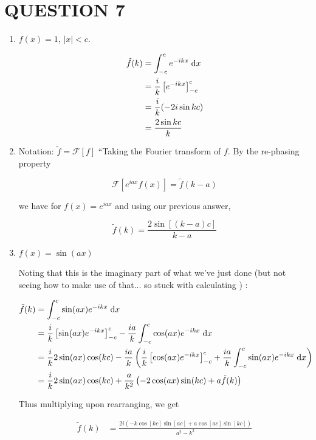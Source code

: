 \documentclass[a4paper]{article}
\begin{document}
\section{QUESTION 7}

\begin{enumerate}
	\item $ f(x) = 1 $, $ | x | < c $.
	
	\begin{align*}
	\tilde{f}(k)  & = \int_{-c}^{c} e^{-ikx} \; \mathrm{d} x   \\
	& = \frac{i}{k} \left[    e^{-ikx}  \right]_{-c}^{c} \\
	& =  \frac{i}{k}(- 2 i \sin k c) \\
	& = \frac{2 \sin kc}{k}
	\end{align*}
	
	\item
	
	Notation: $ \tilde{f} = \mathcal{F}[f] $ ``Taking the Fourier transform of $ f $. By the re-phasing property
	
	\[ \mathcal{F}[ e^{iax}f(x) ] = \tilde{f}(k-a) \]
	
	we have for $ f(x) = e^{iax} $ and using our previous answer,
	
	\[ \tilde{f}(k) = \frac{2\sin[(k-a)c]}{k-a} \]
	
	\item $ f(x) = \sin (ax) $
	
	Noting that this is the imaginary part of what we've just done (but not seeing how to make use of that... so stuck with calculating ) :
	
	\begin{align*}
	\tilde{f}(k)  & = \int_{-c}^{c} \sin(ax) e^{-ikx} \; \mathrm{d} x   \\
	& = \frac{i}{k} \left[ \sin(ax)e^{-ikx}  \right]_{-c}^{c} - \frac{ia}{k} \int_{-c}^{c} \cos(ax)e^{-ikx} \; \mathrm{d} x  \\
	& = \frac{i}{k} 2\sin(ax)\cos(kc) - \frac{ia}{k} \left(   \frac{i}{k} \left[ \cos(ax)e^{-ikx}  \right]_{-c}^{c} + \frac{ia}{k} \int_{-c}^{c} \sin(ax)e^{-ikx} \; \mathrm{d} x \right) \\
	& = \frac{i}{k} 2\sin(ax)\cos(kc) + \frac{a}{k^{2}} \left(  -2\cos(ax)\sin(kc) + a \tilde{f}(k) \right) 
	\end{align*}
	
	Thus multiplying upon rearranging, we get
	
	\begin{align*}
	\tilde{f}(k) & = \frac{2i \left(  - k \cos[kc]\sin[ac] + a \cos[ac]\sin[kc]   \right)}{a^{2} - k^{2}} \\
	\end{align*}
	

\end{enumerate}
\end{document}
